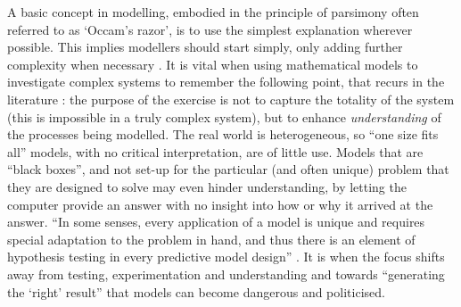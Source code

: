 A basic concept in modelling, embodied in the principle of parsimony
often referred to as `Occam's razor',
is to use the simplest explanation wherever possible. This implies
modellers should start simply, only adding further complexity when
necessary \citep{batty1976urban}.  It is vital when
using mathematical models to investigate complex systems to remember the
following point, that recurs in the literature \citep{Wilson1970, Smil1993,
MacKay2009}: the purpose of the exercise is not to capture the totality
of the system (this is impossible in a truly complex system), but to enhance
\emph{understanding} of the processes being modelled.
The real world is heterogeneous, so ``one size fits all'' models, with no
critical interpretation, are of little use. Models that are ``black
boxes'', and not set-up for the particular (and often unique) problem that they
are designed to solve may even hinder understanding,
by letting the computer provide an answer with no insight into how or why it
arrived at the answer. ``In some senses, every
application of a model is unique and requires special adaptation to the
problem in hand, and thus there is an element of hypothesis testing in
every predictive model design'' \citep[p.~4]{batty1976urban}. It is when the
focus shifts away from testing, experimentation and understanding and towards
``generating the `right' result'' that models can become dangerous and
politicised.

